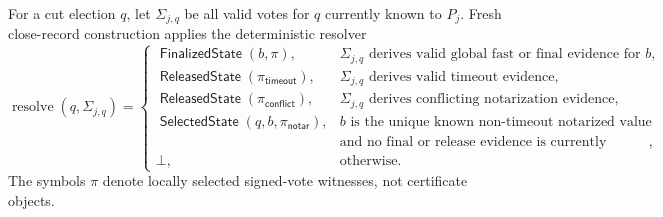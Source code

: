 \documentclass[sigplan,twocolumn,review,anonymous]{acmart}
\newcommand{\func}[1]{\operatorname{\mathsf{#1}}}
\newcommand{\SelectedState}{\func{SelectedState}}
\newcommand{\FinalizedState}{\func{FinalizedState}}
\newcommand{\ReleasedState}{\func{ReleasedState}}
\begin{document}
For a cut election \(q\), let \(\Sigma_{j,q}\) be all valid votes for \(q\) currently known to
\(P_j\).  Fresh close-record construction applies the deterministic resolver
\[
\operatorname{resolve}(q,\Sigma_{j,q})=
\begin{cases}
\FinalizedState(b,\pi),
  & \Sigma_{j,q}\text{ derives valid global fast or final evidence for }b,\\
\ReleasedState(\pi_{\mathsf{timeout}}),
  & \Sigma_{j,q}\text{ derives valid timeout evidence},\\
\ReleasedState(\pi_{\mathsf{conflict}}),
  & \Sigma_{j,q}\text{ derives conflicting notarization evidence},\\
\SelectedState(q,b,\pi_{\mathsf{notar}}),
  & b\text{ is the unique known non-timeout notarized value}\\
  & \text{and no final or release evidence is currently known},\\
\bot, & \text{otherwise.}
\end{cases}
\]
The symbols \(\pi\) denote locally selected signed-vote witnesses, not certificate objects.
\end{document}
